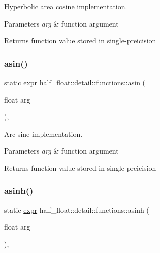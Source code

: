 Hyperbolic area cosine implementation. 
\begin{DoxyParams}{Parameters}
{\em arg} & function argument \\
\hline
\end{DoxyParams}
\begin{DoxyReturn}{Returns}
function value stored in single-\/preicision 
\end{DoxyReturn}
\mbox{\label{structhalf__float_1_1detail_1_1functions_affe61d343c1d3a6b647290fe7c2f1b34}} 
\subsubsection{\texorpdfstring{asin()}{asin()}}
{\footnotesize\ttfamily static \hyperlink{structhalf__float_1_1detail_1_1expr}{expr} half\+\_\+float\+::detail\+::functions\+::asin (\begin{DoxyParamCaption}\item[{float}]{arg }\end{DoxyParamCaption})\hspace{0.3cm}{\ttfamily [inline]}, {\ttfamily [static]}}

Arc sine implementation. 
\begin{DoxyParams}{Parameters}
{\em arg} & function argument \\
\hline
\end{DoxyParams}
\begin{DoxyReturn}{Returns}
function value stored in single-\/preicision 
\end{DoxyReturn}
\mbox{\label{structhalf__float_1_1detail_1_1functions_a33affc06820efb1dbbbf2f4d3f221c43}} 
\subsubsection{\texorpdfstring{asinh()}{asinh()}}
{\footnotesize\ttfamily static \hyperlink{structhalf__float_1_1detail_1_1expr}{expr} half\+\_\+float\+::detail\+::functions\+::asinh (\begin{DoxyParamCaption}\item[{float}]{arg }\end{DoxyParamCaption})\hspace{0.3cm}{\ttfamily [inline]}, {\ttfamily [static]}}

